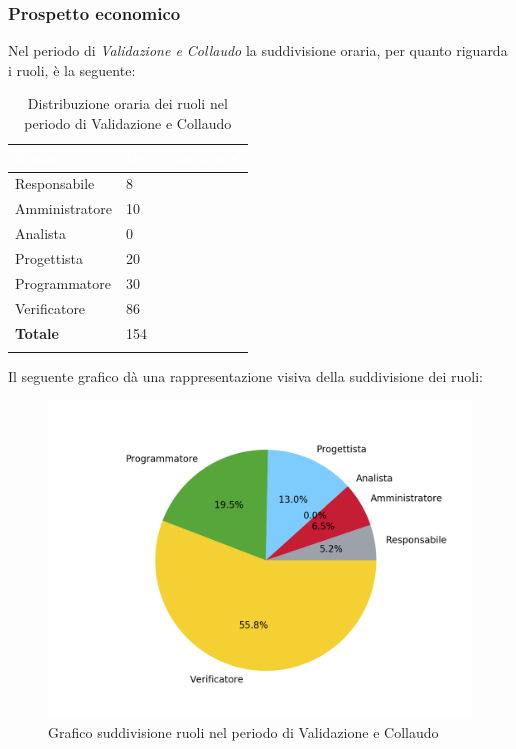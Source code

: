 \subsubsection{Prospetto economico}
Nel periodo di \textit{Validazione e Collaudo} la suddivisione oraria, per quanto riguarda i ruoli, è la seguente: 


\begin{longtable}{| C{.30\textwidth}| C{.15\textwidth}| C{.20\textwidth}|}
	\hline
	\textbf{\textcolor{white}{Ruolo}} & \textbf{\textcolor{white}{Ore}} & \textbf{\textcolor{white}{Costo in \euro}} \\
	\hline 
	Responsabile & 8 &  \\
	\hline
	Amministratore & 10 & \\
	\hline
	Analista & 0 &  \\
	\hline
	Progettista & 20 &  \\
	\hline
	Programmatore & 30 &  \\
	\hline
	Verificatore & 86 &  \\
	\hline
	\textbf{Totale} & 154 & \\ 
	\hline
	
	\caption{Distribuzione oraria dei ruoli nel periodo di Validazione e Collaudo}
	\label{Distribuzione oraria del periodo di Validazione e collaudo}
\end{longtable}

Il seguente grafico dà una rappresentazione visiva della suddivisione dei ruoli:
\begin{figure}[H]
	\centering
	\includegraphics[width=1\linewidth]{./images/torta_vc.png}
	\caption{Grafico suddivisione ruoli nel periodo di Validazione e Collaudo}
	\label{fig:grafico suddivione ruoli periodo di Validazione e collaudo}
\end{figure}

